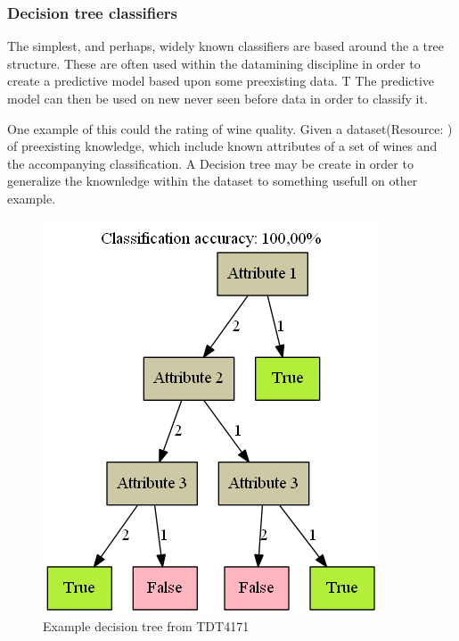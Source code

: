 \subsubsection{Decision tree classifiers}
	The simplest, and perhaps, widely known classifiers are based around the a tree structure. 
	These are often used within the datamining discipline in order to create a predictive model based upon some preexisting data. T
	The predictive model can then be used on new never seen before data in order to classify it. 
	
	\bigskip\noindent
	One example of this could the rating of wine quality.
	Given a dataset(Resource: \cite{mining:datasetexample}) of preexisting knowledge, which include known attributes of a set of wines and the accompanying classification. A Decision tree may be create in order to generalize the knownledge within the dataset to something usefull on other example. 
	
	\begin{figure}[H]%
		\includegraphics[width=\columnwidth]{images/TrivialDecisionTree.png}%
		\caption{Example decision tree from TDT4171}%
		\label{fig:decisiontree}%
	\end{figure}
